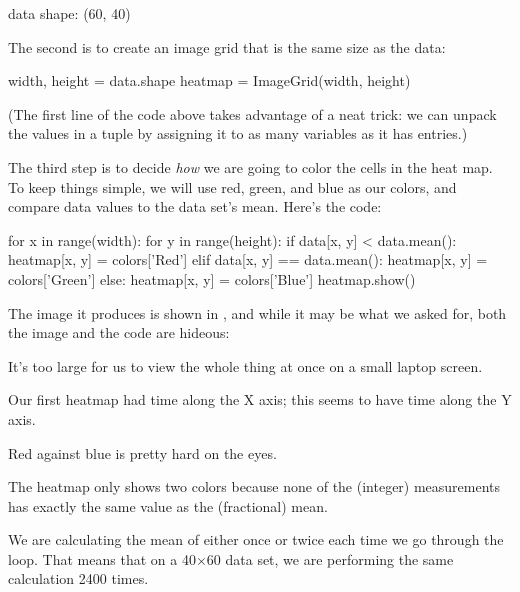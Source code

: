 \begin{VerbOut}
data shape: (60, 40)
\end{VerbOut}

The second is to create an image grid that is the same size as the data:

\begin{VerbIn}
width, height = data.shape
heatmap = ImageGrid(width, height)
\end{VerbIn}

(The first line of the code above takes advantage of a neat trick: we
can unpack the values in a tuple by assigning it to as many variables as
it has entries.)

The third step is to decide \emph{how} we are going to color the cells
in the heat map. To keep things simple, we will use red, green, and blue
as our colors, and compare data values to the data set's mean. Here's
the code:

\begin{VerbIn}
for x in range(width):
    for y in range(height):
        if data[x, y] < data.mean():
            heatmap[x, y] = colors['Red']
        elif data[x, y] == data.mean():
            heatmap[x, y] = colors['Green']
        else:
            heatmap[x, y] = colors['Blue']
heatmap.show()
\end{VerbIn}


The image it produces is shown in ,
and while it may be what we asked for,
both the image and the code are hideous:

\begin{swcenumerate}
\item
  It's too large for us to view the whole thing at once on a small
  laptop screen.
\item
  Our first heatmap had time along the X axis; this seems to have time
  along the Y axis.
\item
  Red against blue is pretty hard on the eyes.
\item
  The heatmap only shows two colors because none of the (integer)
  measurements has exactly the same value as the (fractional) mean.
\item
  We are calculating the mean of  either once or twice each
  time we go through the loop. That means that on a 40${\times}$60 data set, we
  are performing the same calculation 2400 times.
\end{swcenumerate}

